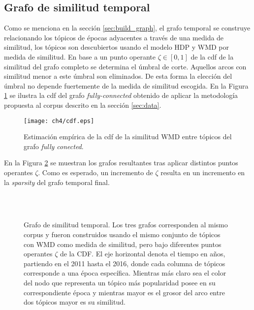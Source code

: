 \subsection{Grafo de similitud temporal}

Como se menciona en la sección \ref{sec:build_graph}, el grafo temporal se construye relacionando los tópicos de épocas adyacentes a través de una medida de similitud, los tópicos son descubiertos usando el modelo HDP y WMD por medida de similitud. En base a un punto operante $\zeta \in [0,1]$ de la cdf de la similitud del grafo completo se determina el úmbral de corte. Aquellos arcos con similitud menor a este úmbral son eliminados. De esta forma la elección del úmbral no depende fuertemente de la medida de similitud escogida. En la Figura \ref{img:cdf_wmd} se ilustra la cdf del grafo \textit{fully-connected} obtenido de aplicar la metodología propuesta al corpus descrito en la sección \ref{sec:data}.

\begin{figure}
    \centering
    \texttt{[image: ch4/cdf.eps]}
    \caption{Estimación empírica de la cdf de la similitud WMD entre tópicos del grafo \textit{fully conected}.}
    \label{img:cdf_wmd}
\end{figure}

En la Figura \ref{img:temporal_similarity_graphs} se muestran los grafos resultantes tras aplicar distintos puntos operantes $\zeta$. Como es esperado, un incremento de $\zeta$ resulta en un incremento en la \textit{sparsity} del grafo temporal final.

\begin{figure}
\centering
{}
\\
\\
\caption{Grafo de similitud temporal. Los tres grafos corresponden al mismo corpus y fueron construidos usando el mismo conjunto de tópicos con WMD como medida de similitud, pero bajo diferentes puntos operantes $\zeta$ de la CDF. El eje horizontal denota el tiempo en años, partiendo en el 2011 hasta el 2016, donde cada columna de tópicos corresponde a una época específica. Mientras más claro sea el color del nodo que representa un tópico más popularidad posee en su correspondiente época y mientras mayor es el grosor del arco entre dos tópicos mayor es su similitud.}
\label{img:temporal_similarity_graphs}
\end{figure}


